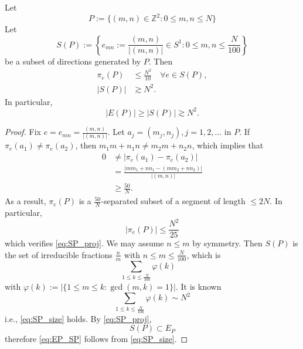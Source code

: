     \begin{theorem}
    Let
        \begin{equation*}
            P:=\{ (m,n)\in \mathbb{Z}^{2}:0\leq m,n\leq N \}
        \end{equation*}
    Let
        \begin{equation*}
            S(P):=\left\{  e_{mn}:=\frac{(m,n)}{|(m,n)|}\in S^{1}:0\leq m,n\leq \frac{N}{100}  \right\}
        \end{equation*}
    be a subset of directions generated by $P$. Then
    \begin{align}
        \pi_{e}(P) &\leq \frac{N^{2}}{10}\quad \forall e\in S(P),\label{eq:SP_proj} \\
        |S(P)| &\gtrsim N^{2}.\label{eq:SP_size}
        \end{align}
    In particular,
        \begin{equation}
            |E(P)|\geq|S(P)|\gtrsim N^{2}.
        \label{eq:EP_SP}
        \end{equation}
    \label{thm:SP}
    \end{theorem}
    \begin{proof}
    Fix $e=e_{mn}=\frac{(m,n)}{|(m,n)|}$. Let $a_{j}=(m_{j},n_{j}),j=1,2,\dots$ in $P$. If $\pi_{e}(a_{1})\neq \pi_{e}(a_{2})$, then $m_{1}m+n_{1}n\neq m_{2}m+n_{2}n$, which implies that
    \begin{align*}
        0 &\neq |\pi_{e}(a_{1})-\pi_{e}(a_{2})| \\
        &= \frac{|mm_{1}+nn_{1}-(mm_{2}+nn_{2})|}{|(m,n)|} \\
        &\geq \frac{50}{N}.
    \end{align*}
    As a result, $\pi_{e}(P)$ is a $\frac{50}{N}$-separated subset of a segment of length $\leq 2N$. In particular,
        \begin{equation*}
            |\pi_{e}(P)|\leq \frac{N^{2}}{25}
        \end{equation*}
    which verifies \eqref{eq:SP_proj}.
    We may assume $n\leq m$ by symmetry. Then $S(P)$ is the set of irreducible fractions $\frac{n}{m}$ with $n\leq m \leq \frac{N}{100}$, which is
        \begin{equation}
            \sum_{1\leq k\leq \frac{N}{100}}\varphi(k)\quad \label{eq:phi_sum}
        \end{equation}
    with $\varphi(k):=|\{ 1\leq m\leq k: \operatorname{gcd}(m,k)=1 \}|$.
    It is known
        \begin{equation*}
            \sum_{1\leq k\leq \frac{N}{100}}\varphi(k) \sim N^{2}
        \end{equation*}
    i.e., \eqref{eq:SP_size} holds.
    By \eqref{eq:SP_proj},
        \begin{equation*}
            S(P)\subset E_{P}
        \end{equation*}
    therefore \eqref{eq:EP_SP} follows from \eqref{eq:SP_size}.
    \end{proof}

